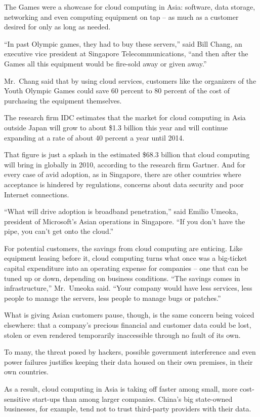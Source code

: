 ﻿\documentclass[12pt]{article}
\begin{document}
The Games were a showcase for cloud computing in Asia: software, data storage, networking and even
computing equipment on tap -- as much as a customer desired for only as long as needed.

``In past Olympic games, they had to buy these servers,'' said Bill Chang, an executive vice
president at Singapore Telecommunications, ``and then after the Games all this equipment would be
fire-sold away or given away.''

Mr.~Chang said that by using cloud services, customers like the organizers of the Youth Olympic
Games could save 60 percent to 80 percent of the cost of purchasing the equipment themselves.

The research firm IDC estimates that the market for cloud computing in Asia outside Japan will grow
to about \$1.3 billion this year and will continue expanding at a rate of about 40 percent a year
until 2014.

That figure is just a splash in the estimated \$68.3 billion that cloud computing will bring in
globally in 2010, according to the research firm Gartner. And for every case of avid adoption, as in
Singapore, there are other countries where acceptance is hindered by regulations, concerns about
data security and poor Internet connections.

``What will drive adoption is broadband penetration,'' said Emilio Umeoka, president of Microsoft's
Asian operations in Singapore. ``If you don't have the pipe, you can't get onto the cloud.''

For potential customers, the savings from cloud computing are enticing. Like equipment leasing
before it, cloud computing turns what once was a big-ticket capital expenditure into an operating
expense for companies -- one that can be tuned up or down, depending on business conditions. ``The
savings comes in infrastructure,'' Mr.~Umeoka said. ``Your company would have less services, less
people to manage the servers, less people to manage bugs or patches.''

What is giving Asian customers pause, though, is the same concern being voiced elsewhere: that a
company's precious financial and customer data could be lost, stolen or even rendered temporarily
inaccessible through no fault of its own.

To many, the threat posed by hackers, possible government interference and even power failures
justifies keeping their data housed on their own premises, in their own countries.

As a result, cloud computing in Asia is taking off faster among small, more cost-sensitive start-ups
than among larger companies. China's big state-owned businesses, for example, tend not to trust
third-party providers with their data.
\end{document}
